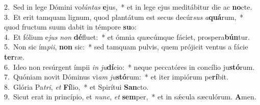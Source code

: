 {2.~}Sed in lege Dómini vo\textit{lún}\textit{tas} \textbf{e}jus,~* et in lege ejus meditábitur die ac \textbf{no}cte.\\
{3.~}Et erit tamquam lignum, quod plantátum est secus decúr\textit{sus} \textit{a}\textbf{quá}rum,~* quod fructum suum dabit in témpore \textbf{su}o:\\
{4.~}Et fólium e\textit{jus} \textit{non} \textbf{dé}fluet:~* et ómnia quæcúmque fáciet, prospera\textbf{bún}tur.\\
{5.~}Non sic ím\textit{pi}\textit{i}, \textbf{non} sic:~* sed tamquam pulvis, quem prójicit ventus a fácie \textbf{ter}ræ.\\
{6.~}Ideo non resúrgent ímpii \textit{in} \textit{ju}\textbf{dí}cio:~* neque peccatóres in concílio ju\textbf{stó}rum.\\
{7.~}Quóniam novit Dóminus vi\textit{am} \textit{ju}\textbf{stó}rum:~* et iter impiórum pe\textbf{rí}bit.\\
{8.~}Glória Pa\textit{tri}, \textit{et} \textbf{Fí}lio,~* et Spirítui \textbf{San}cto.\\
{9.~}Sicut erat in princípio, et \textit{nunc}, \textit{et} \textbf{sem}per,~* et in sǽcula sæculórum. \textbf{A}men.\\
